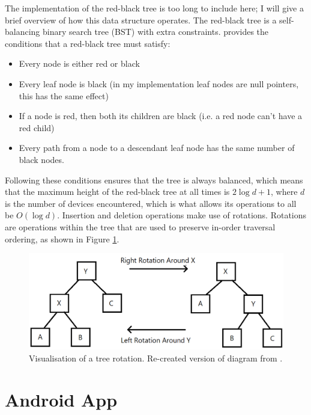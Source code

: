 \documentclass{l4proj}
\begin{document}
The implementation of the red-black tree is too long to include here; I will give a brief overview of how this data structure operates. The red-black tree is a self-balancing binary search tree (BST) with extra constraints. \citet{morris_data_1998} provides the conditions that a red-black tree must satisfy:

\begin{itemize}
    \item Every node is either red or black
    \item Every leaf node is black (in my implementation leaf nodes are null pointers, this has the same effect)
    \item If a node is red, then both its children are black (i.e. a red node can't have a red child)
    \item Every path from a node to a descendant leaf node has the same number of black nodes.
\end{itemize}

Following these conditions ensures that the tree is always balanced, which means that the maximum height of the red-black tree at all times is $2\log{d + 1}$, where $d$ is the number of devices encountered, which is what allows its operations to all be $O(\log{d})$. Insertion and deletion operations make use of rotations. Rotations are operations within the tree that are used to preserve in-order traversal ordering, as shown in Figure \ref{fig:tree_rotation}.

\begin{figure}[!htb]
    \centering
    \includegraphics[width=0.8\linewidth]{images/rbtree_rotation.png}

    \caption{ Visualisation of a tree rotation. Re-created version of diagram from \citep{morris_data_1998}. }

    \label{fig:tree_rotation}
\end{figure}

\section{Android App}
\end{document}

